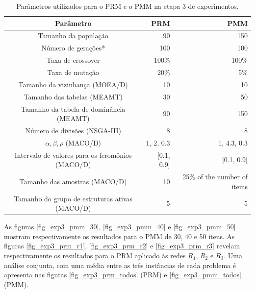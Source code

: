 \begin{table}[!htbp]
	\caption{Parâmetros utilizados para o PRM e o PMM na etapa 3 de experimentos.}
	\label{table_exp3_parametros}
	\begin{center}
		\begin{tabular}{c|r|r}
			\textbf{Parâmetro} & \textbf{PRM} &  \textbf{PMM} \\ %
			\hline
			Tamanho da população               &    90 &      150 \\ %
			Número de gerações*        &   100 &      100 \\ %
			Taxa de crossover                & 100\% &    100\% \\ %
			Taxa de mutação                 &  20\% &      5\% \\ %
			Tamanho da vizinhança (MOEA/D)    &    10 &       10 \\ %
			Tamanho das tabelas (MEAMT)   &    30 &       50 \\ %
			Tamanho da tabela de dominância (MEAMT) &    90 &      150 \\ %
			Número de divisões (NSGA-III)&     8 &        8 \\ %
			$\alpha, \beta, \rho$ (MACO/D)& 1, 2, 0.3 & 1, 4.3, 0.3 \\ %
			Intervalo de valores para os feromônios (MACO/D)& [0.1, 0.9] & [0.1, 0.9] \\ %
			Tamanho das amostras (MACO/D)& 10 &25\% of the number of items \\  %
			Tamanho do grupo de estruturas ativas (MACO/D)& 5 & 5 \\
			\hline
		\end{tabular}
	\end{center}
\end{table}

As figuras \ref{fig_exp3_pmm_30}, \ref{fig_exp3_pmm_40} e \ref{fig_exp3_pmm_50} mostram respectivamente os resultados para o PMM de 30, 40 e 50 itens. As figuras \ref{fig_exp3_prm_r1}, \ref{fig_exp3_prm_r2} e \ref{fig_exp3_prm_r3} revelam respectivamente os resultados para o PRM aplicado às redes $R_1$, $R_2$ e $R_3$. Uma análise conjunta, com uma média entre as três instâncias de cada problema é apresenta nas figuras \ref{fig_exp3_prm_todos} (PRM) e \ref{fig_exp3_pmm_todos} (PMM).

